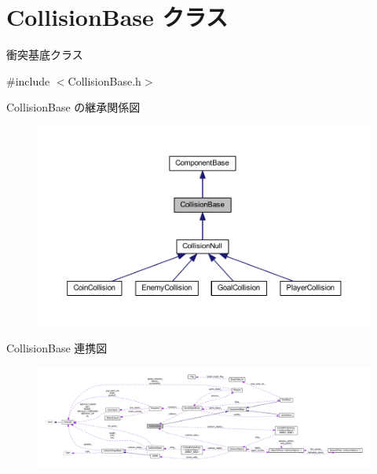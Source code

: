 \hypertarget{class_collision_base}{}\section{Collision\+Base クラス}
\label{class_collision_base}


衝突基底クラス  




{\ttfamily \#include $<$Collision\+Base.\+h$>$}



Collision\+Base の継承関係図\nopagebreak
\begin{figure}[H]
\begin{center}
\leavevmode
\includegraphics[width=350pt]{class_collision_base__inherit__graph}
\end{center}
\end{figure}


Collision\+Base 連携図\nopagebreak
\begin{figure}[H]
\begin{center}
\leavevmode
\includegraphics[width=350pt]{class_collision_base__coll__graph}
\end{center}
\end{figure}
